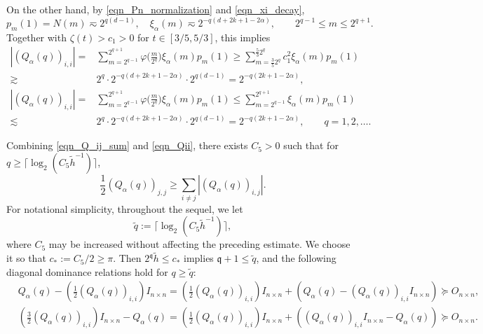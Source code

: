 \documentclass{article}
\numberwithin{equation}{section}
\def\sul{\sum\limits}
\def\mq{\mathfrak{q}}
\begin{document}
On the other hand, by \eqref{eqn_Pn_normalization} and \eqref{eqn_xi_decay},
\begin{equation*}
    p_m(1)=N(m)\eqsim2^{q(d-1)},\quad\xi_\alpha(m)\eqsim2^{-q(d+2k+1-2\alpha)},\qquad2^{q-1}\leq m\leq2^{q+1}.
\end{equation*}
Together with $\zeta(t)>c_1>0$ for $t\in[3/5,5/3]$, this implies
\begin{equation}\label{eqn_Qii}
    \begin{split}
        \left|\left(Q_{\alpha}(q)\right)_{i,i}\right|
        =&\sul_{m=2^{q-1}}^{2^{q+1}}\varphi\big(\frac{m}{2^q}\big)\xi_\alpha(m)p_m(1)
        \geq\sul_{m=\frac{3}{5}2^{q}}^{\frac{5}{3}2^{q}}c_1^2\xi_\alpha(m)p_m(1)\\
        \gtrsim&2^q\cdot2^{-q(d+2k+1-2\alpha)}\cdot2^{q(d-1)}
        =2^{-q(2k+1-2\alpha)},\\
        \left|\left(Q_{\alpha}(q)\right)_{i,i}\right|
        =&\sul_{m=2^{q-1}}^{2^{q+1}}\varphi\big(\frac{m}{2^q}\big)\xi_\alpha(m)p_m(1)
        \leq\sul_{m=2^{q-1}}^{2^{q+1}}\xi_\alpha(m)p_m(1)\\
        \lesssim&2^q\cdot2^{-q(d+2k+1-2\alpha)}\cdot2^{q(d-1)}
        =2^{-q(2k+1-2\alpha)},\qquad q=1,2,\dots.
    \end{split}
\end{equation}

Combining \eqref{eqn_Q_ij_sum} and \eqref{eqn_Qii}, there exists $C_5>0$ such that for $q\geq\lceil\log_2(C_5\tilde{h}^{-1})\rceil$,
\begin{equation*}
    \frac{1}{2}\left(Q_{\alpha}(q)\right)_{j,j}\geq\sul_{i\neq j}\left|\left(Q_{\alpha}(q)\right)_{i,j}\right|.
\end{equation*}
For notational simplicity, throughout the sequel, we let
\begin{equation}
    \tilde q:=\lceil\log_2(C_5\tilde{h}^{-1})\rceil,
\end{equation}
where $C_5$ may be increased without affecting the preceding estimate. We choose it so that $c_*:=C_5/2\geq\pi$. Then $2^\mq\tilde h\leq c_*$ implies $\mq+1\leq\tilde q$, and the following diagonal dominance relations hold for $q\geq\tilde q$:
\begin{equation}\label{eqn:dig_dom_matrix}
    \begin{split}
        &Q_{\alpha}(q)-\left(\frac{1}{2}\left(Q_{\alpha}(q)\right)_{i,i}\right)I_{n\times n}=\left(\frac{1}{2}\left(Q_{\alpha}(q)\right)_{i,i}\right)I_{n\times n}+\left(Q_{\alpha}(q)-\left(Q_{\alpha}(q)\right)_{i,i}I_{n\times n}\right)\succeq O_{n\times n},\\
        &\left(\frac{3}{2}\left(Q_{\alpha}(q)\right)_{i,i}\right)I_{n\times n}-Q_{\alpha}(q)=\left(\frac{1}{2}\left(Q_{\alpha}(q)\right)_{i,i}\right)I_{n\times n}+\left(\left(Q_{\alpha}(q)\right)_{i,i}I_{n\times n}-Q_{\alpha}(q)\right)\succeq O_{n\times n}.
    \end{split}
\end{equation}
\end{document}
